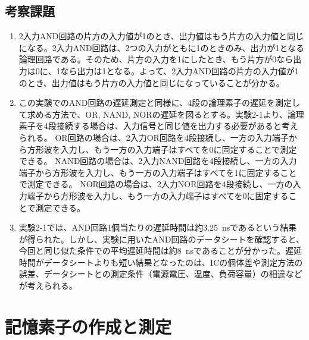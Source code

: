 \documentclass[uplatex, a4j, dvipdfmx]{jsarticle}
\begin{document}
\subsection{考察課題}
\begin{enumerate}[label=(\arabic*), itemsep=1.5ex, leftmargin=2.5em]
    \item 2入力AND回路の片方の入力値が1のとき、出力値はもう片方の入力値と同じになる。2入力AND回路は、2つの入力がともに1のときのみ、出力が1となる論理回路である。そのため、片方の入力を1にしたとき、もう片方が0なら出力は0に、1なら出力は1となる。よって、2入力AND回路の片方の入力値が1のとき、出力値はもう片方の入力値と同じになっていることが分かる。
    
    \item この実験でのAND回路の遅延測定と同様に、4段の論理素子の遅延を測定して求める方法で、OR, NAND, NORの遅延を図るとする。実験2-1より、論理素子を4段接続する場合は、入力信号と同じ値を出力する必要があると考えられる。
    OR回路の場合は、2入力OR回路を4段接続し、一方の入力端子から方形波を入力し、もう一方の入力端子はすべてを0に固定することで測定できる。
    NAND回路の場合は、2入力NAND回路を4段接続し、一方の入力端子から方形波を入力し、もう一方の入力端子はすべてを1に固定することで測定できる。
    NOR回路の場合は、2入力NOR回路を4段接続し、一方の入力端子から方形波を入力し、もう一方の入力端子はすべてを0に固定することで測定できる。
    
    \item 実験2-1では、AND回路1個当たりの遅延時間は約\SI{3.25}{\nano\second}であるという結果が得られた。しかし、実験に用いたAND回路のデータシートを確認すると、今回と同じ似た条件での平均遅延時間は約\SI{8}{\nano\second}であることが分かった。遅延時間がデータシートよりも短い結果となったのは、ICの個体差や測定方法の誤差、データシートとの測定条件（電源電圧、温度、負荷容量）の相違などが考えられる。
\end{enumerate}

\section{記憶素子の作成と測定}
\end{document}
